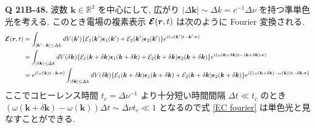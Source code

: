 \documentclass[uplatex,dvipdfmx,a4paper,11pt]{jlreq}
\newcommand{\RR}{\mathbb{R}}
\newcommand{\rr}{\bm{r}}
\newcommand{\kk}{\bm{k}}
\theoremstyle{definition}
\begin{document}
\textbf{Q 21B-48.}
波数 $\kk\in\RR^3$ を中心にして, 広がり $|\Delta\kk|\sim\Delta k = c^{-1}\Delta\nu$ を持つ準単色光を考える. このとき電場の複素表示 $\EC(\rr, t)$ は次のように Fourier 変換される.
\begin{align}
  \EC(\rr, t)
   & = \int_{|\kk' - \kk|\leq\Delta k}dV(\kk')\qty{\Ec_1(\kk')\ee_1(\kk') + \Ec_2(\kk')\ee_2(\kk')}e^{i(\omega(\kk')t - \kk'\vdot\rr)}                                                                                                                                         \\
   & = \int_{|\delta\kk|\leq\Delta k}dV(\delta\kk)\qty{\Ec_1(\kk + \delta\kk)\ee_1(\kk + \delta\kk) + \Ec_2(\kk + \delta\kk)\ee_2(\kk + \delta\kk)}e^{i(\omega(\kk + \delta\kk)t - (\kk + \delta\kk)\vdot\rr)}                                                                 \\
   & = e^{i(\omega(\kk)t - \kk\vdot\rr)}\int_{|\delta\kk|\leq\Delta k}dV(\delta\kk)\qty{\Ec_1(\kk + \delta\kk)\ee_1(\kk + \delta\kk) + \Ec_2(\kk + \delta\kk)\ee_2(\kk + \delta\kk)}e^{i\qty{(\omega(\kk + \delta\kk) - \omega(\kk))t - \delta\kk\vdot\rr}} \label{EC fourier} \\
\end{align}
ここでコヒーレンス時間 $t_c = \Delta\nu^{-1}$ より十分短い時間間隔 $\Delta t \ll t_c$ のとき $(\omega(\kk + \delta\kk) - \omega(\kk))\Delta t \sim \Delta\nu t_c \ll 1$ となるので式 \eqref{EC fourier} は単色光と見なすことができる. \\
\end{document}
